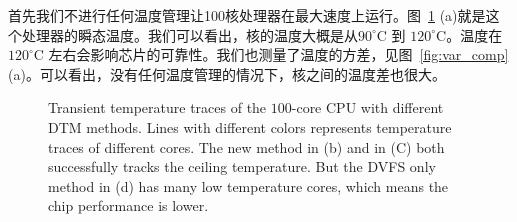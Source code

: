 首先我们不进行任何温度管理让100核处理器在最大速度上运行。图~\ref{fig:temp} (a)就是这个处理器的瞬态温度。我们可以看出，核的温度大概是从$90^{\circ}$C
到 $120^{\circ}$C。温度在$120^{\circ}$C 左右会影响芯片的可靠性。我们也测量了温度的方差，见图~\ref{fig:var_comp} (a)。可以看出，没有任何温度管理的情况下，核之间的温度差也很大。

\begin{figure}[H]
  \centering

  \caption{Transient temperature traces of the $100$-core
    CPU with different DTM methods. Lines with different colors
    represents temperature traces of different cores. The new method
    in (b) and \cite{MaWang:APCCAS'14} in (C) both successfully tracks
    the ceiling temperature. But the DVFS only method in (d) has many
    low temperature cores, which means the chip performance is lower.}\label{fig:temp}
\end{figure}
